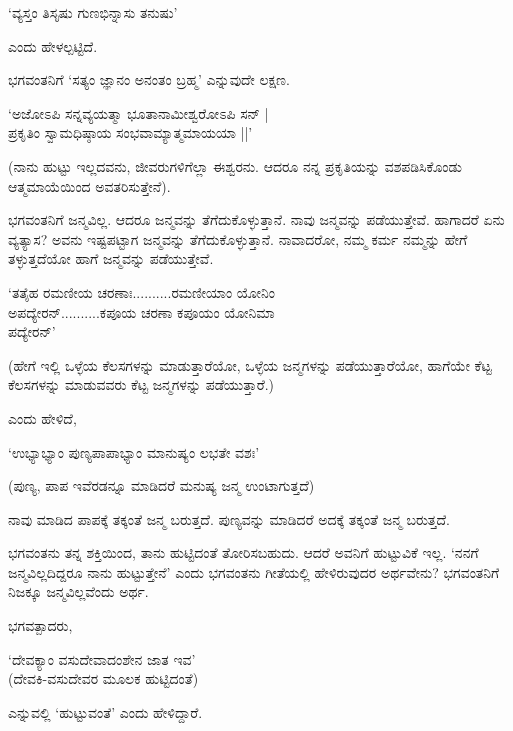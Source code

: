 \begin{shloka}
`ವ್ಯಸ್ತಂ ತಿಸೃಷು ಗುಣಭಿನ್ನಾಸು ತನುಷು'
\end{shloka}

ಎಂದು ಹೇಳಲ್ಪಟ್ಟಿದೆ.

ಭಗವಂತನಿಗೆ `ಸತ್ಯಂ ಜ್ಞಾನಂ ಅನಂತಂ ಬ್ರಹ್ಮ' ಎನ್ನುವುದೇ ಲಕ್ಷಣ.

\begin{shloka}
`ಅಜೋಽಪಿ ಸನ್ನವ್ಯಯತ್ಮಾ ಭೂತಾನಾಮೀಶ್ವರೋಽಪಿ ಸನ್ |\\
ಪ್ರಕೃತಿಂ ಸ್ವಾಮಧಿಷ್ಠಾಯ ಸಂಭವಾಮ್ಯಾತ್ಮಮಾಯಯಾ ||'
\end{shloka}

(ನಾನು ಹುಟ್ಟು ಇಲ್ಲದವನು, ಜೀವರುಗಳಿಗೆಲ್ಲಾ ಈಶ್ವರನು. ಆದರೂ ನನ್ನ ಪ್ರಕೃತಿಯನ್ನು ವಶಪಡಿಸಿಕೊಂಡು ಆತ್ಮಮಾಯೆಯಿಂದ ಅವತರಿಸುತ್ತೇನೆ).


ಭಗವಂತನಿಗೆ ಜನ್ಮವಿಲ್ಲ. ಆದರೂ ಜನ್ಮವನ್ನು ತೆಗೆದುಕೊಳ್ಳುತ್ತಾನೆ. ನಾವು ಜನ್ಮವನ್ನು ಪಡೆಯುತ್ತೇವೆ. ಹಾಗಾದರೆ ಏನು ವ್ಯತ್ಯಾಸ? ಅವನು ಇಷ್ಟಪಟ್ಟಾಗ ಜನ್ಮವನ್ನು ತೆಗೆದುಕೊಳ್ಳುತ್ತಾನೆ. ನಾವಾದರೋ, ನಮ್ಮ ಕರ್ಮ ನಮ್ಮನ್ನು ಹೇಗೆ ತಳ್ಳುತ್ತದೆಯೋ ಹಾಗೆ ಜನ್ಮವನ್ನು ಪಡೆಯುತ್ತೇವೆ.

\begin{shloka}
`ತತೈಹ ರಮಣೀಯ ಚರಣಾಃ..........ರಮಣೀಯಾಂ ಯೋನಿಂ\\
ಅಪದ್ಯೇರನ್..........ಕಪೂಯ ಚರಣಾ ಕಪೂಯಂ ಯೋನಿಮಾ\\
ಪದ್ಯೇರನ್'
\end{shloka}

(ಹೇಗೆ ಇಲ್ಲಿ ಒಳ್ಳೆಯ ಕೆಲಸಗಳನ್ನು ಮಾಡುತ್ತಾರೆಯೋ, ಒಳ್ಳೆಯ ಜನ್ಮಗಳನ್ನು ಪಡೆಯುತ್ತಾರೆಯೋ, ಹಾಗೆಯೇ ಕೆಟ್ಟ ಕೆಲಸಗಳನ್ನು ಮಾಡುವವರು ಕೆಟ್ಟ ಜನ್ಮಗಳನ್ನು ಪಡೆಯುತ್ತಾರೆ.)

ಎಂದು ಹೇಳಿದೆ,

\begin{shloka}
`ಉಭ್ಯಾಭ್ಯಾಂ ಪುಣ್ಯಪಾಪಾಭ್ಯಾಂ ಮಾನುಷ್ಯಂ ಲಭತೇ ವಶಃ'
\end{shloka}

(ಪುಣ್ಯ, ಪಾಪ ಇವೆರಡನ್ನೂ ಮಾಡಿದರೆ ಮನುಷ್ಯ ಜನ್ಮ ಉಂಟಾಗುತ್ತದೆ)

ನಾವು ಮಾಡಿದ ಪಾಪಕ್ಕೆ ತಕ್ಕಂತೆ ಜನ್ಮ ಬರುತ್ತದೆ. ಪುಣ್ಯವನ್ನು ಮಾಡಿದರೆ ಅದಕ್ಕೆ ತಕ್ಕಂತೆ ಜನ್ಮ ಬರುತ್ತದೆ.

ಭಗವಂತನು ತನ್ನ ಶಕ್ತಿಯಿಂದ, ತಾನು ಹುಟ್ಟಿದಂತೆ ತೋರಿಸಬಹುದು. ಆದರೆ ಅವನಿಗೆ ಹುಟ್ಟುವಿಕೆ ಇಲ್ಲ. `ನನಗೆ ಜನ್ಮವಿಲ್ಲದಿದ್ದರೂ ನಾನು ಹುಟ್ಟುತ್ತೇನೆ' ಎಂದು ಭಗವಂತನು ಗೀತೆಯಲ್ಲಿ ಹೇಳಿರುವುದರ ಅರ್ಥವೇನು? ಭಗವಂತನಿಗೆ ನಿಜಕ್ಕೂ ಜನ್ಮವಿಲ್ಲವೆಂದು ಅರ್ಥ.

ಭಗವತ್ಪಾದರು,

\begin{shloka}
`ದೇವಕ್ಯಾಂ ವಸುದೇವಾದಂಶೇನ ಜಾತ ಇವ'\\
(ದೇವಕಿ-ವಸುದೇವರ ಮೂಲಕ ಹುಟ್ಟಿದಂತೆ)
\end{shloka}

ಎನ್ನುವಲ್ಲಿ `ಹುಟ್ಟುವಂತೆ' ಎಂದು ಹೇಳಿದ್ದಾರೆ.

